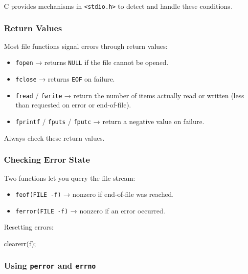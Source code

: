 \documentclass[
  letterpaper,
  DIV=11,
  numbers=noendperiod]{scrreprt}
\newenvironment{Shaded}{\begin{snugshade}}{\end{snugshade}}
\newcommand{\NormalTok}[1]{\textcolor[rgb]{0.00,0.23,0.31}{#1}}
\newcommand{\OperatorTok}[1]{\textcolor[rgb]{0.37,0.37,0.37}{#1}}
\providecommand{\tightlist}{%
  \setlength{\itemsep}{0pt}\setlength{\parskip}{0pt}}
\begin{document}
C provides mechanisms in \texttt{\textless{}stdio.h\textgreater{}} to
detect and handle these conditions.

\subsubsection{Return Values}\label{return-values-1}

Most file functions signal errors through return values:

\begin{itemize}
\tightlist
\item
  \texttt{fopen} → returns \texttt{NULL} if the file cannot be opened.
\item
  \texttt{fclose} → returns \texttt{EOF} on failure.
\item
  \texttt{fread} / \texttt{fwrite} → return the number of items actually
  read or written (less than requested on error or end-of-file).
\item
  \texttt{fprintf} / \texttt{fputs} / \texttt{fputc} → return a negative
  value on failure.
\end{itemize}

Always check these return values.

\subsubsection{Checking Error State}\label{checking-error-state}

Two functions let you query the file stream:

\begin{itemize}
\tightlist
\item
  \texttt{feof(FILE\ -f)} → nonzero if end-of-file was reached.
\item
  \texttt{ferror(FILE\ -f)} → nonzero if an error occurred.
\end{itemize}

Resetting errors:

\begin{Shaded}
\begin{Highlighting}[]
\NormalTok{clearerr}\OperatorTok{(}\NormalTok{f}\OperatorTok{);}
\end{Highlighting}
\end{Shaded}

\subsubsection{\texorpdfstring{Using \texttt{perror} and
\texttt{errno}}{Using perror and errno}}\label{using-perror-and-errno}
\end{document}
